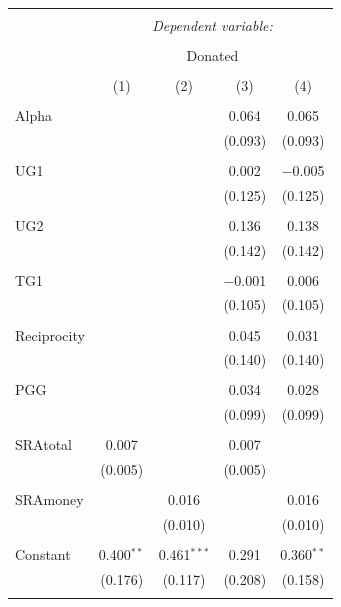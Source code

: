 \documentclass[12pt]{article}
\begin{document}
\begin{table}[!htbp] \centering 
  \caption{} 
  \label{} 
            \begin{adjustbox}{width=\textwidth}
\begin{tabular}{@{\extracolsep{5pt}}lcccc} 
\\[-1.8ex]\hline 
\hline \\[-1.8ex] 
 & \multicolumn{4}{c}{\textit{Dependent variable:}} \\ 
\cline{2-5} 
\\[-1.8ex] & \multicolumn{4}{c}{Donated} \\ 
\\[-1.8ex] & (1) & (2) & (3) & (4)\\ 
\hline \\[-1.8ex] 
 Alpha &  &  & 0.064 & 0.065 \\ 
  &  &  & (0.093) & (0.093) \\ 
  & & & & \\ 
 UG1 &  &  & 0.002 & $-$0.005 \\ 
  &  &  & (0.125) & (0.125) \\ 
  & & & & \\ 
 UG2 &  &  & 0.136 & 0.138 \\ 
  &  &  & (0.142) & (0.142) \\ 
  & & & & \\ 
 TG1 &  &  & $-$0.001 & 0.006 \\ 
  &  &  & (0.105) & (0.105) \\ 
  & & & & \\ 
 Reciprocity &  &  & 0.045 & 0.031 \\ 
  &  &  & (0.140) & (0.140) \\ 
  & & & & \\ 
 PGG &  &  & 0.034 & 0.028 \\ 
  &  &  & (0.099) & (0.099) \\ 
  & & & & \\ 
 SRAtotal & 0.007 &  & 0.007 &  \\ 
  & (0.005) &  & (0.005) &  \\ 
  & & & & \\ 
 SRAmoney &  & 0.016 &  & 0.016 \\ 
  &  & (0.010) &  & (0.010) \\ 
  & & & & \\ 
 Constant & 0.400$^{**}$ & 0.461$^{***}$ & 0.291 & 0.360$^{**}$ \\ 
  & (0.176) & (0.117) & (0.208) & (0.158) \\ 
  & & & & \\ 

\end{tabular}
\end{adjustbox}
\end{table}
\end{document}
